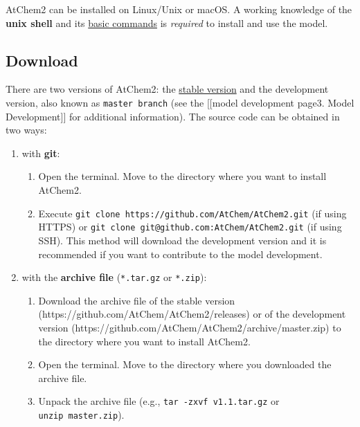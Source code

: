 AtChem2 can be installed on Linux/Unix or macOS. A working knowledge of
the \textbf{unix shell} and its
\href{https://swcarpentry.github.io/shell-novice/reference/}{basic
commands} is \emph{required} to install and use the model.

\hypertarget{download}{%
\subsection{Download}\label{download}}

There are two versions of AtChem2: the
\href{https://github.com/AtChem/AtChem2/releases}{stable version} and
the development version, also known as \texttt{master\ branch} (see the
{[}{[}model development page\textbar{}3. Model Development{]}{]} for
additional information). The source code can be obtained in two ways:

\begin{enumerate}
\def\labelenumi{\arabic{enumi}.}
\tightlist
\item
  with \textbf{git}:

  \begin{enumerate}
  \def\labelenumii{\arabic{enumii}.}
  \tightlist
  \item
    Open the terminal. Move to the directory where you want to install
    AtChem2.
  \item
    Execute \texttt{git\ clone\ https://github.com/AtChem/AtChem2.git}
    (if using HTTPS) or
    \texttt{git\ clone\ git@github.com:AtChem/AtChem2.git} (if using
    SSH). This method will download the development version and it is
    recommended if you want to contribute to the model development.
  \end{enumerate}
\item
  with the \textbf{archive file} (\texttt{*.tar.gz} or \texttt{*.zip}):

  \begin{enumerate}
  \def\labelenumii{\arabic{enumii}.}
  \tightlist
  \item
    Download the archive file of the stable version
    (https://github.com/AtChem/AtChem2/releases) or of the development
    version (https://github.com/AtChem/AtChem2/archive/master.zip) to
    the directory where you want to install AtChem2.
  \item
    Open the terminal. Move to the directory where you downloaded the
    archive file.
  \item
    Unpack the archive file (e.g., \texttt{tar\ -zxvf\ v1.1.tar.gz} or
    \texttt{unzip\ master.zip}).
  \end{enumerate}
\end{enumerate}

